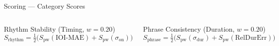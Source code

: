 \documentclass[aspectratio=169,9pt]{beamer}
\begin{document}
\begin{frame}{Scoring --- Category Scores}
  \medskip
  \begin{columns}[T]
      \begin{block}{\footnotesize Rhythm Stability (Timing, $w=0.20$)}
        \footnotesize
        \[
          S_\text{rhythm}
            = \tfrac{1}{2}\bigl(S_\text{pw}(\mathrm{IOI\text{-}MAE}) + S_\text{pw}(\sigma_\text{on})\bigr)
        \]
      \end{block}
      \begin{block}{\footnotesize Phrase Consistency (Duration, $w=0.20$)}
        \footnotesize
        \[
          S_\text{phrase}
            = \tfrac{1}{2}\bigl(S_\text{pw}(\sigma_\text{dur}) + S_\text{pw}(\mathrm{RelDurErr})\bigr)
        \]
      \end{block}
  \end{columns}
\end{frame}
\end{document}
